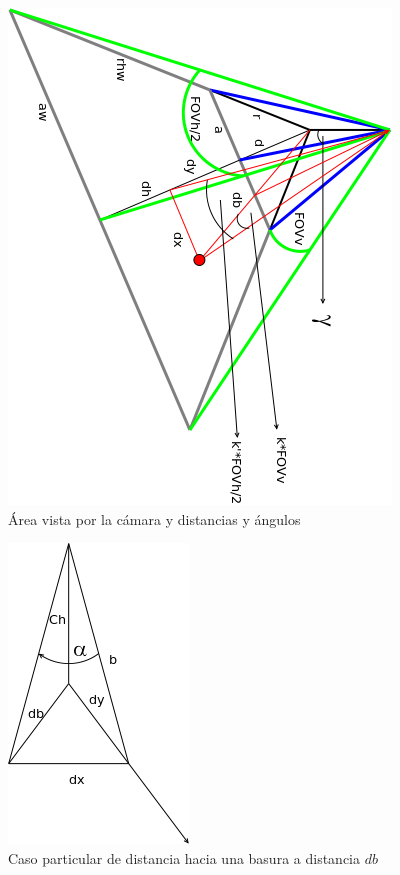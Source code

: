 \begin{figure}[htp]
\begin{center}
\includegraphics[scale=0.75]{comportamientos/figures/altoDiagram.png}
\caption[\'Area vista por la c\'amara y distancias y \'angulos]
		{\'Area vista por la c\'amara y distancias y \'angulos}
\label{fig:altoDiag}
\end{center}
\end{figure}

\begin{figure}[htp]
\begin{center}
\includegraphics[scale=0.5]{comportamientos/figures/trianglesAll.png}
\caption[Caso particular de distancia hacia una basura]
		{Caso particular de distancia hacia una basura a distancia $db$}
\label{fig:triAll}
\end{center}
\end{figure}


